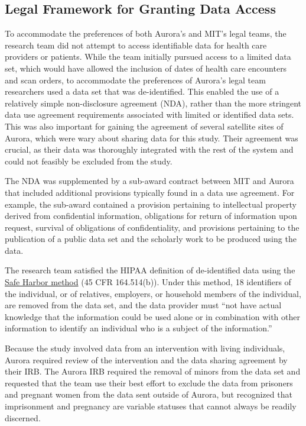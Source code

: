 \hypertarget{legal-framework-for-granting-data-access-3}{%
\subsection{Legal Framework for Granting Data Access}\label{legal-framework-for-granting-data-access-3}}

To accommodate the preferences of both Aurora's and MIT's legal teams, the research team did not attempt to access identifiable data for health care providers or patients. While the team initially pursued access to a limited data set, which would have allowed the inclusion of dates of health care encounters and scan orders, to accommodate the preferences of Aurora's legal team researchers used a data set that was de-identified. This enabled the use of a relatively simple non-disclosure agreement (NDA), rather than the more stringent data use agreement requirements associated with limited or identified data sets. This was also important for gaining the agreement of several satellite sites of Aurora, which were wary about sharing data for this study. Their agreement was crucial, as their data was thoroughly integrated with the rest of the system and could not feasibly be excluded from the study.

The NDA was supplemented by a sub-award contract between MIT and Aurora that included additional provisions typically found in a data use agreement. For example, the sub-award contained a provision pertaining to intellectual property derived from confidential information, obligations for return of information upon request, survival of obligations of confidentiality, and provisions pertaining to the publication of a public data set and the scholarly work to be produced using the data.

The research team satisfied the HIPAA definition of de-identified data using the \href{https://www.hhs.gov/hipaa/for-professionals/privacy/special-topics/de-identification/index.html\#safeharborguidance}{Safe Harbor method} (45 CFR 164.514(b)). Under this method, 18 identifiers of the individual, or of relatives, employers, or household members of the individual, are removed from the data set, and the data provider must ``not have actual knowledge that the information could be used alone or in combination with other information to identify an individual who is a subject of the information.''

Because the study involved data from an intervention with living individuals, Aurora required review of the intervention and the data sharing agreement by their IRB. The Aurora IRB required the removal of minors from the data set and requested that the team use their best effort to exclude the data from prisoners and pregnant women from the data sent outside of Aurora, but recognized that imprisonment and pregnancy are variable statuses that cannot always be readily discerned.

